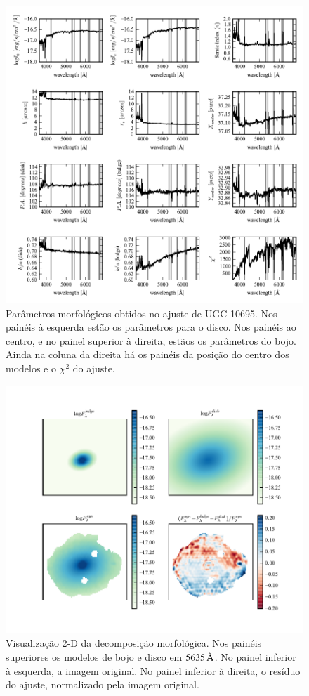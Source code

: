 \begin{figure}
	\includegraphics{figuras/decomp-fit-parameters}
	\caption[Parâmetros morfológicos] {Parâmetros morfológicos obtidos no ajuste
	de UGC 10695. Nos painéis à esquerda estão os parâmetros para o disco. Nos
	painéis ao centro, e no painel superior à direita, estãos os parâmetros do
	bojo. Ainda na coluna da direita há os painéis da posição do centro dos
	modelos e o $\chi^2$ do ajuste.}
	\label{fig:decompParams}
\end{figure}

\begin{figure}
	\includegraphics{figuras/decomp-model-images}
	\caption[Visualização 2-D da decomposição morfológica] {Visualização 2-D da
	decomposição morfológica. Nos painéis superiores os modelos de bojo e disco em
	$5635\,\text{\normalfont\AA}$. No painel inferior à esquerda, a imagem original. No painel
	inferior à direita, o resíduo do ajuste, normalizado pela imagem original.}
	\label{fig:decompImages}
\end{figure}

